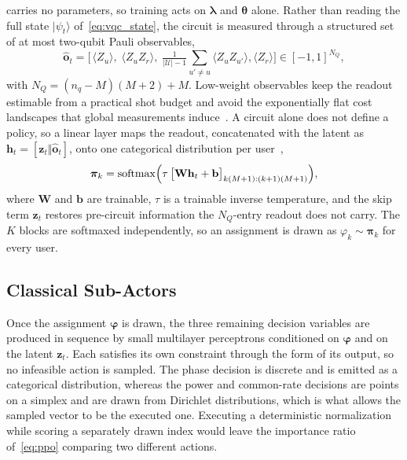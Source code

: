 \documentclass[12pt,onecolumn]{IEEEtran}
\newif\iffull
\begin{document}
carries no parameters, so training acts on $\boldsymbol{\lambda}$ and
$\boldsymbol{\theta}$ alone. Rather than reading the full state $|\psi_t\rangle$ of~\eqref{eq:vqc_state}, the circuit
is measured through a structured set of at most two-qubit Pauli observables,
\begin{equation}
    \hat{\mathbf{o}}_t
    =
    \bigl[\,
    \langle Z_u\rangle,\;
    \langle Z_u Z_r\rangle,\;
    \tfrac{1}{|\mathcal{U}|-1}\!\!\sum_{u'\neq u}\!\langle Z_u Z_{u'}\rangle,
    \langle Z_r\rangle\bigr]
    \in [-1,1]^{N_Q},
    \label{eq:observables}
\end{equation}
with $N_Q=(n_q-M)(M+2)+M$. Low-weight observables keep the readout estimable from a
practical shot budget and avoid the exponentially flat cost landscapes that global
measurements induce~\cite{cerezo2021cost,mcclean2018barren}. A circuit alone does not
define a policy, so a linear layer maps the readout, concatenated with the latent as
$\mathbf{h}_t=[\mathbf{z}_t \Vert \hat{\mathbf{o}}_t]$, onto one categorical distribution
per user~\cite{jerbi2021parametrized},
\begin{equation}
    \boldsymbol{\pi}_k
    =
    \mathrm{softmax}\Bigl(\tau\,\bigl[\mathbf{W}\mathbf{h}_t+\mathbf{b}\bigr]_{k(M{+}1):(k+1)(M{+}1)}\Bigr),
    \label{eq:pi_k}
\end{equation}
where $\mathbf{W}$ and $\mathbf{b}$ are trainable, $\tau$ is a trainable inverse
temperature, and the skip term $\mathbf{z}_t$ restores pre-circuit information the
$N_Q$-entry readout does not carry. The $K$ blocks are softmaxed independently, so an
assignment is drawn as $\varphi_k\sim\boldsymbol{\pi}_k$ for every user.
\fi

\subsection{Classical Sub-Actors}
\label{sec:subactors}
\iffull
Once the assignment $\boldsymbol{\varphi}$ is drawn, the three remaining decision variables are produced in sequence by small multilayer perceptrons conditioned on $\boldsymbol{\varphi}$ and on the latent $\mathbf{z}_t$.
Each satisfies its own constraint through the form of its output, so no infeasible action is sampled.
The phase decision is discrete and is emitted as a categorical distribution, whereas the power and common-rate decisions are points on a simplex and are drawn from Dirichlet distributions, which is what allows the sampled vector to be the executed one.
Executing a deterministic normalization while scoring a separately drawn index would leave the importance ratio of~\eqref{eq:ppo} comparing two different actions.
\end{document}
